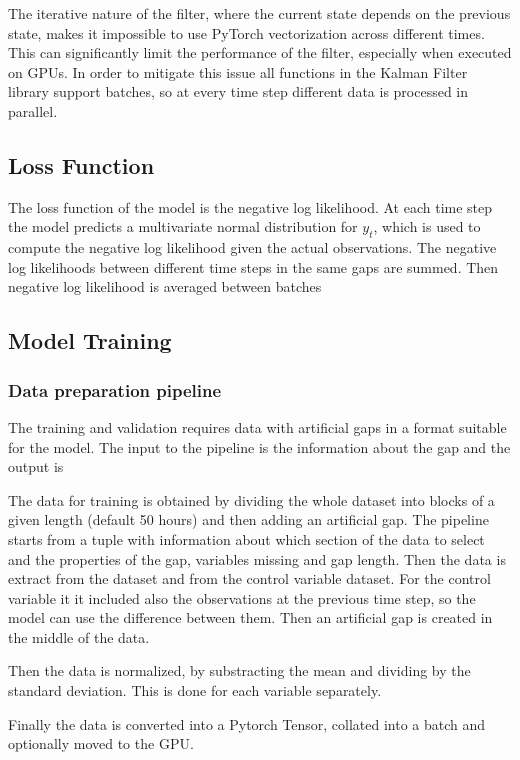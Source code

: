 \documentclass{article}
\let\Oldsubsection\subsection
\renewcommand{\subsection}{\FloatBarrier\Oldsubsection}
\let\Oldsubsubsection\subsubsection
\renewcommand{\subsubsection}{\FloatBarrier\Oldsubsubsection}
\begin{document}
The iterative nature of the filter, where the current state depends on the previous state, makes it impossible to use PyTorch vectorization across different times. This can significantly limit the performance of the filter, especially when executed on GPUs. In order to  mitigate this issue all functions in the Kalman Filter library support batches, so at every time step different data is processed in parallel.

\subsection{Loss Function}

The loss function of the model is the negative log likelihood. At each time step the model predicts a multivariate normal distribution for $y_t$, which is used to compute the negative log likelihood given the actual observations. The negative log likelihoods between different time steps in the same gaps are summed. Then negative log likelihood is averaged between batches

\subsection{Model Training}

\subsubsection{Data preparation pipeline}

The training and validation requires data with artificial gaps in a format suitable for the model.
The input to the pipeline is the information about the gap and the output is

The data for training is obtained by dividing the whole dataset into blocks of a given length (default 50 hours) and then adding an artificial gap.
The pipeline starts from a tuple with information about which section of the data to select and the properties of the gap, variables missing and gap length. Then the data is extract from the dataset and from the control variable dataset. For the control variable it it included also the observations at the previous time step, so the model can use the difference between them. Then an artificial gap is created in the middle of the data.

Then the data is normalized, by substracting the mean and dividing by the standard deviation. This is done for each variable separately.

Finally the data is converted into a Pytorch Tensor, collated into a batch and optionally moved to the GPU.
\end{document}
